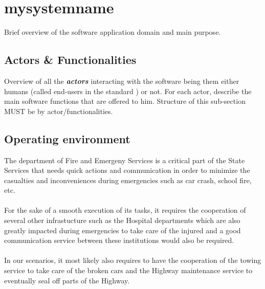 \section{mysystemname}
Brief overview of the software application domain and main purpose.


\subsection{Actors \& Functionalities}
Overview of all the \textbf{\emph{\glspl{actor}}} interacting with the software
being them either humans (called end-users in the standard
\cite{IEEE-2001-userdocumentation}) or not. For each actor, describe the main
software functions that are offered to him. Structure of this sub-section MUST
be by actor/functionalities.


\subsection{Operating environment}
The department of Fire and Emergeny Services is a critical part of the State
Services that needs quick actions and communication in order to minimize the
casualties and inconveniences during emergencies such as car crash, school fire,
etc. \\\\
For the sake of a smooth execution of its tasks, it requires the
cooperation of several other infrastucture such as the Hospital departments
which are also greatly impacted during emergencies to take care of the injured
and a good communication service between these institutions would also be
required. \\\\
In our scenarios, it most likely also requires to have the cooperation of
the towing service to take care of the broken cars and the Highway maintenance
service to eventually seal off parts of the Highway.


